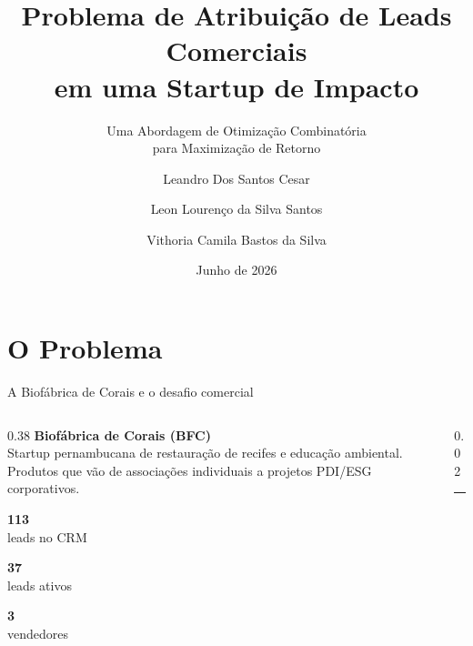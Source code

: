 \documentclass[aspectratio=169,11pt]{beamer}
\title[Atribui\c{c}\~{a}o de Leads -- BFC]{%
  Problema de Atribui\c{c}\~{a}o de Leads Comerciais\\
  em uma Startup de Impacto}
\subtitle{Uma Abordagem de Otimiza\c{c}\~{a}o Combinat\'{o}ria\\
  para Maximiza\c{c}\~{a}o de Retorno}
\author[Leandro \textperiodcentered{} Leon \textperiodcentered{} Vithoria]{%
  Leandro Dos Santos Cesar \and
  Leon Louren\c{c}o da Silva Santos \and
  Vithoria Camila Bastos da Silva}
\institute{Universidade Federal Rural de Pernambuco\\T\'{o}picos em Otimiza\c{c}\~{a}o}
\date{Junho de 2026}
\newcommand{\bigstat}[2]{%
  \begin{center}
    {\fontsize{36}{40}\selectfont\bfseries\color{Cazul}#1}\\[2pt]
    {\small\color{Ccinza}#2}
  \end{center}%
}
\begin{document}
\begin{frame}
  \titlepage
\end{frame}

\section{O Problema}

\begin{frame}{A Biof\'{a}brica de Corais e o desafio comercial}
\begin{columns}[c]

\begin{column}{0.38\textwidth}
  \textbf{Biof\'{a}brica de Corais (BFC)}\\[0.5em]
  \small Startup pernambucana de restaura\c{c}\~{a}o de recifes
  e educa\c{c}\~{a}o ambiental. Produtos que v\~{a}o de associa\c{c}\~{o}es
  individuais a projetos PDI/ESG corporativos.

  \vspace{0.8em}
  \bigstat{113}{leads no CRM}
  \bigstat{37}{leads ativos}
  \bigstat{3}{vendedores}
\end{column}

\begin{column}{0.02\textwidth}
  \textcolor{Cclaro}{\rule{0.8pt}{0.68\textheight}}
\end{column}


\end{columns}
\end{frame}
\end{document}
